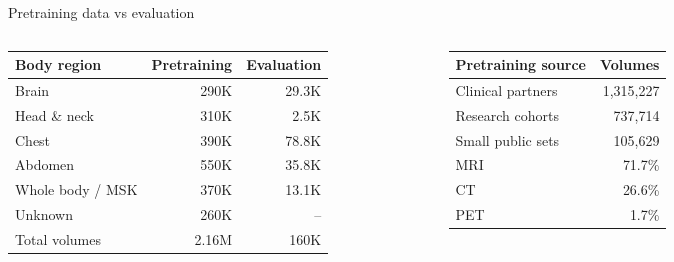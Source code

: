 \documentclass[aspectratio=169,11pt]{beamer}
\newcommand{\best}[1]{{\interbold #1}}
\begin{document}
\begin{frame}{Pretraining data vs evaluation}
\vskip14pt
\small
\begin{columns}[T,onlytextwidth]
\begin{tabular}{@{}l r r@{}}
\toprule
Body region & Pretraining & Evaluation \\
\midrule
Brain & 290K & 29.3K \\
Head \& neck & 310K & 2.5K \\
Chest & 390K & 78.8K \\
Abdomen & 550K & 35.8K \\
Whole body / MSK & 370K & 13.1K \\
Unknown & 260K & -- \\
\midrule
\best{Total volumes} & \best{2.16M} & \best{160K} \\
\bottomrule
\end{tabular}
\begin{tabular}{@{}l r@{}}
\toprule
Pretraining source & Volumes \\
\midrule
Clinical partners & 1{,}315{,}227 \\
Research cohorts & 737{,}714 \\
Small public sets & 105{,}629 \\
\midrule
MRI & 71.7\% \\
CT & 26.6\% \\
PET & 1.7\% \\
\bottomrule
\end{tabular}
\end{columns}
\end{frame}
\end{document}
